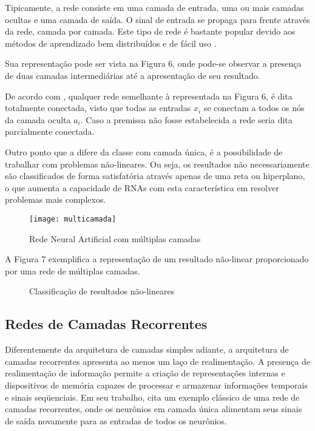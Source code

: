 Tipicamente, a rede consiste em uma camada de entrada, uma ou mais camadas ocultas e uma camada de saída. O sinal de entrada se propaga para frente através da rede, camada por camada. Este tipo de rede é bastante popular devido aos métodos de aprendizado bem distribuídos e de fácil uso \cite{haykin2000}.

Sua representação pode ser vista na Figura 6, onde pode-se observar a presença de duas camadas intermediárias até a apresentação de seu resultado.

De acordo com , qualquer rede semelhante à representada na Figura 6, é dita totalmente conectada, visto que todas as entradas $x_i$ se conectam a todos os nós da camada oculta $a_i$. Caso a premissa não fosse estabelecida a rede seria dita parcialmente conectada.

Outro ponto que a difere da classe com camada única, é a possibilidade de trabalhar com problemas não-lineares. Ou seja, os resultados não necessariamente são classificados de forma satisfatória através apenas de uma reta ou hiperplano, o que aumenta a capacidade de RNAs com esta característica em resolver problemas mais complexos.

\begin{figure}[h]
	\centering
	\texttt{[image: multicamada]}
	\caption{Rede Neural Artificial com múltiplas camadas}
	\label{fig-multiplas-camadas}
\end{figure}

A Figura 7 exemplifica a representação de um resultado não-linear proporcionado por uma rede de múltiplas camadas.

\begin{figure}[h]
	\centering
	\caption{Classificação de resultados não-lineares}
	\label{exec-nao-linear-imagem}
\end{figure}

\subsection{Redes de Camadas Recorrentes}
Diferentemente da arquitetura de camadas simples adiante, a arquitetura de camadas recorrentes apresenta ao menos um laço de realimentação. A presença de realimentação de informação permite a criação de representações internas e dispositivos de memória capazes de processar e armazenar informações temporais e sinais seqüenciais. Em seu trabalho,  cita um exemplo clássico de uma rede de camadas recorrentes, onde os neurônios em camada única alimentam seus sinais de saída novamente para as entradas de todos os neurônios.

